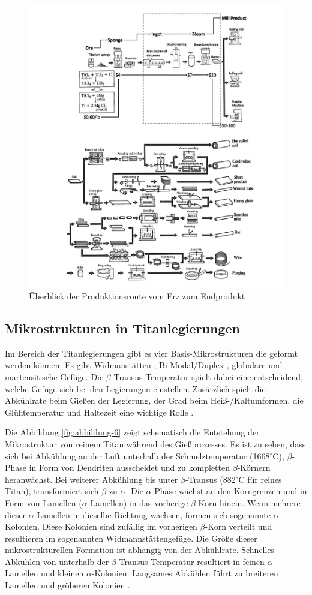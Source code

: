 \begin{figure}[h]
	\centering
	\includegraphics[width=0.7\linewidth]{./Bilder/Abbildung 2.png}
	\caption[Abbildung 2]{Überblick der Produktionsroute vom Erz zum Endprodukt \cite{M.J.Donachie.2010}}
	\label{fig:abbildung-2}
\end{figure}

\pagebreak

\subsection{Mikrostrukturen in Titanlegierungen}
Im Bereich der Titanlegierungen gibt es vier Basis-Mikrostrukturen die geformt werden können. Es gibt Widmanstätten-, Bi-Modal/Duplex-, globulare und martensitische Gefüge. Die $\beta$-Transus Temperatur spielt dabei eine entscheidend, welche Gefüge sich bei den Legierungen einstellen. Zusätzlich spielt die Abkühlrate beim Gießen der Legierung, der Grad beim Heiß-/Kaltumformen, die Glühtemperatur und Haltezeit eine wichtige Rolle \cite{C.Leyens.2005,Lutjering.2007,Boyer.2007,M.J.Donachie.2010}.

Die Abbildung \ref{fig:abbildung-6} zeigt schematisch die Entstehung der Mikrostruktur von reinem Titan während des Gießprozesses. Es ist zu sehen, dass sich bei Abkühlung an der Luft unterhalb der Schmelztemperatur (1668$^\circ$C), $\beta$-Phase in Form von Dendriten ausscheidet und zu kompletten $\beta$-Körnern heranwächst. Bei weiterer Abkühlung bis unter $\beta$-Transus (882$^\circ$C für reines Titan), transformiert sich $\beta$ zu $\alpha$. Die $\alpha$-Phase wächst an den Korngrenzen und in Form von Lamellen ($\alpha$-Lamellen) in das vorherige $\beta$-Korn hinein. Wenn mehrere dieser $\alpha$-Lamellen in dieselbe Richtung wachsen, formen sich sogenannte $\alpha$-Kolonien. Diese Kolonien sind zufällig im vorherigen $\beta$-Korn verteilt und resultieren im sogenannten Widmannstättengefüge. Die Größe dieser mikrostrukturellen Formation ist abhängig von der Abkühlrate. Schnelles Abkühlen von unterhalb der $\beta$-Transus-Temperatur resultiert in feinen $\alpha$-Lamellen und kleinen $\alpha$-Kolonien. Langsames Abkühlen führt zu breiteren Lamellen und gröberen Kolonien \cite{C.Leyens.2005,Lutjering.2007,Boyer.2007,M.J.Donachie.2010}. 

